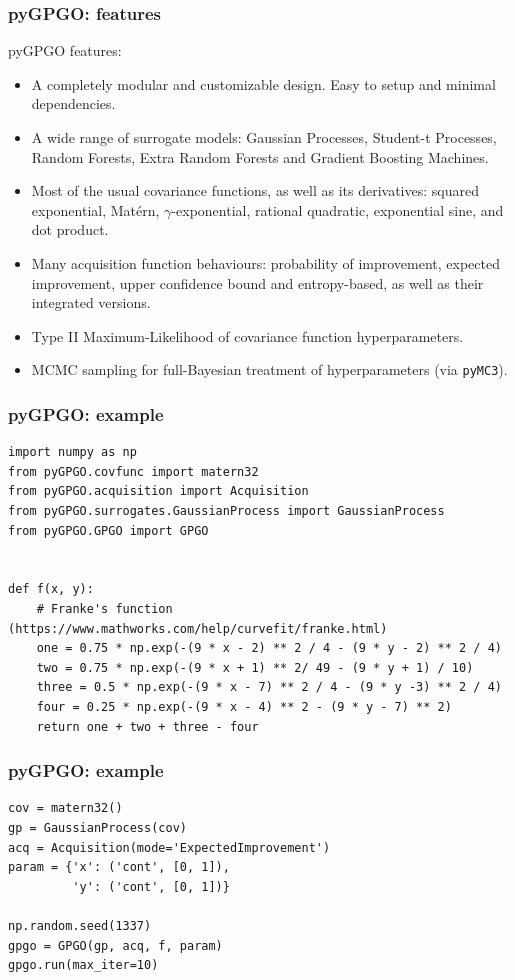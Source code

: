 \documentclass[10pt]{beamer}
\begin{document}
\begin{frame}
\frametitle{pyGPGO: features}
pyGPGO features:
\begin{itemize}
\item A completely modular and customizable design. Easy to setup and minimal dependencies.
\item A wide range of surrogate models: Gaussian Processes, Student-t Processes, Random Forests, Extra Random Forests and Gradient Boosting Machines.
\item Most of the usual covariance functions, as well as its derivatives: squared exponential, Mat\'ern, $\gamma$-exponential, rational quadratic, exponential sine, and dot product.
\item Many acquisition function behaviours: probability of improvement, expected improvement, upper confidence bound and entropy-based, as well as their integrated versions.
\item Type II Maximum-Likelihood of covariance function hyperparameters.
\item MCMC sampling for full-Bayesian treatment of hyperparameters (via \texttt{pyMC3}).
\end{itemize}
\end{frame}

\begin{frame}[fragile]
\frametitle{pyGPGO: example}
\begin{verbatim}
import numpy as np
from pyGPGO.covfunc import matern32
from pyGPGO.acquisition import Acquisition
from pyGPGO.surrogates.GaussianProcess import GaussianProcess
from pyGPGO.GPGO import GPGO


def f(x, y):
    # Franke's function (https://www.mathworks.com/help/curvefit/franke.html)
    one = 0.75 * np.exp(-(9 * x - 2) ** 2 / 4 - (9 * y - 2) ** 2 / 4)
    two = 0.75 * np.exp(-(9 * x + 1) ** 2/ 49 - (9 * y + 1) / 10)
    three = 0.5 * np.exp(-(9 * x - 7) ** 2 / 4 - (9 * y -3) ** 2 / 4)
    four = 0.25 * np.exp(-(9 * x - 4) ** 2 - (9 * y - 7) ** 2)
    return one + two + three - four
\end{verbatim}
\end{frame}

\begin{frame}[fragile]
\frametitle{pyGPGO: example}
\begin{verbatim}
cov = matern32()
gp = GaussianProcess(cov)
acq = Acquisition(mode='ExpectedImprovement')
param = {'x': ('cont', [0, 1]),
         'y': ('cont', [0, 1])}

np.random.seed(1337)
gpgo = GPGO(gp, acq, f, param)
gpgo.run(max_iter=10)
\end{verbatim}
\end{frame}
\end{document}
